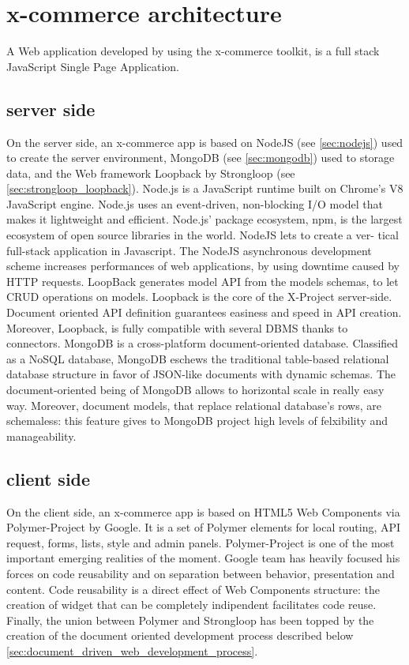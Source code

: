 \section{x-commerce architecture}
\label{sec:x_commerce_architecture}
A Web application developed by using the x-commerce toolkit, is a full stack JavaScript Single Page Application.
\subsection{server side}
On the server side, an x-commerce app is based on NodeJS (see \ref{sec:nodejs}) used to create the server environment, MongoDB (see \ref{sec:mongodb}) used to storage data, and the Web framework Loopback by Strongloop (see \ref{sec:strongloop_loopback}).
\newline
Node.js is a JavaScript runtime built on Chrome’s V8 JavaScript engine. Node.js uses an event-driven, non-blocking I/O model that makes it lightweight and efficient. Node.js’ package ecosystem, npm, is the largest ecosystem of open source libraries in the world. NodeJS lets to create a ver- tical full-stack application in Javascript. The NodeJS asynchronous development scheme increases performances of web applications, by using downtime caused by HTTP requests.
\newline
LoopBack generates model API from the models schemas, to let CRUD operations on models. Loopback is the core of the X-Project server-side. Document oriented API definition guarantees easiness and speed in API creation. Moreover, Loopback, is fully compatible with several DBMS thanks to connectors.
\newline
MongoDB is a cross-platform document-oriented database. Classified as a NoSQL database, MongoDB eschews the traditional table-based relational database structure in favor of JSON-like documents with dynamic schemas. The document-oriented being of MongoDB allows to horizontal scale in really easy way. Moreover, document models, that replace relational database’s rows, are schemaless: this feature gives to MongoDB project high levels of felxibility and manageability.
\subsection{client side}
On the client side, an x-commerce app is based on HTML5 Web Components via Polymer-Project by Google. It is a set of Polymer elements for local routing, API request, forms, lists, style and admin panels.
\newline
Polymer-Project is one of the most important emerging realities of the moment. Google team has heavily focused his forces on code reusability and on separation between behavior, presentation and content. Code reusability is a direct effect of Web Components structure: the creation of widget that can be completely indipendent facilitates code reuse.
\newline
Finally, the union between Polymer and Strongloop has been topped by the creation of the document oriented development process described below \ref{sec:document_driven_web_development_process}.



